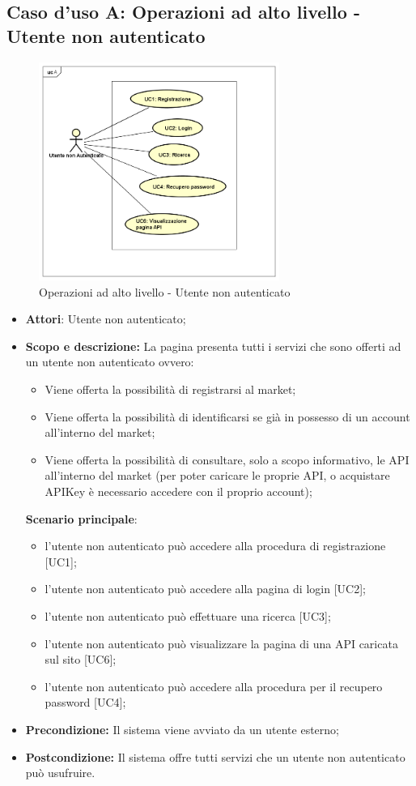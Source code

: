 \documentclass[12pt,a4paper,titlepage]{article}
\begin{document}
	\subsection{Caso d'uso A: Operazioni ad alto livello - Utente non autenticato}
	\begin{figure}[ht]
		\centering
		\includegraphics[width=0.7\textwidth]{UseCase/A}
		\caption{Operazioni ad alto livello - Utente non autenticato}
	\end{figure}
	\begin{itemize}
		\item \textbf{Attori}: Utente non autenticato;
		\item \textbf{Scopo e descrizione:} La pagina presenta tutti i servizi che sono offerti ad un utente non autenticato ovvero:
		\begin{itemize} 
			\item Viene offerta la possibilità di registrarsi al market; 
			\item Viene offerta la possibilità di identificarsi se già in possesso di un account all'interno del market;
			\item Viene offerta la possibilità di consultare, solo a scopo informativo, le API all'interno del market (per poter caricare le proprie API, o acquistare APIKey è necessario accedere con il proprio account); 
		\end{itemize}
		\textbf{Scenario principale}:
			\begin{itemize}
				\item l'utente non autenticato può accedere alla procedura di registrazione [UC1];
				\item l'utente non autenticato può accedere alla pagina di login [UC2];
				\item l'utente non autenticato può effettuare una ricerca [UC3];
				\item l'utente non autenticato può visualizzare la pagina di una API caricata sul sito [UC6];
				\item l'utente non autenticato può accedere alla procedura per il recupero password [UC4];
			\end{itemize}
		\item \textbf{Precondizione:} Il sistema viene avviato da un utente esterno;
		\item \textbf{Postcondizione:} Il sistema offre tutti servizi che un utente non autenticato può usufruire.
	\end{itemize}
\end{document}
